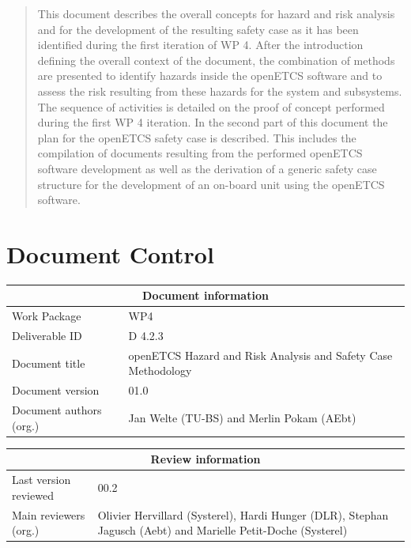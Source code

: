 \documentclass{template/openetcs_report}
\begin{document}



\begin{abstract}
This document describes the overall concepts for hazard and risk analysis and for the development of the resulting safety case as it has been identified during the first iteration of WP 4.
After the introduction defining the overall context of the document, the combination of methods are presented to identify hazards inside the openETCS software and to assess the risk resulting from these hazards for the system and subsystems. The sequence of activities is detailed on the proof of concept performed during the first WP 4 iteration. In the second part of this document the plan for the openETCS safety case is described. This includes the compilation of documents resulting from the performed openETCS software development as well as the derivation of a generic safety case structure for the development of an on-board unit using the openETCS software.
\end{abstract}

\maketitle
\tableofcontents
\listoffiguresandtables
\newpage

\chapter{Document Control}

\begin{tabular}{|p{4.4cm}|p{8.7cm}|}
\hline
\multicolumn{2}{|c|}{Document information} \\
\hline
Work Package &  WP4  \\
Deliverable ID & D 4.2.3\\
\hline
Document title & openETCS Hazard and Risk Analysis and Safety Case Methodology \\
Document version & 01.0 \\
Document authors (org.)  & Jan Welte (TU-BS) and Merlin Pokam (AEbt)\\
\hline
\end{tabular}

\begin{tabular}{|p{4.4cm}|p{8.7cm}|}
\hline
\multicolumn{2}{|c|}{Review information} \\
\hline
Last version reviewed & 00.2 \\
\hline
Main reviewers (org.) & Olivier Hervillard	(Systerel), Hardi Hunger (DLR), Stephan Jagusch (Aebt) and Marielle Petit-Doche (Systerel) \\
\hline
\end{tabular}
\end{document}
